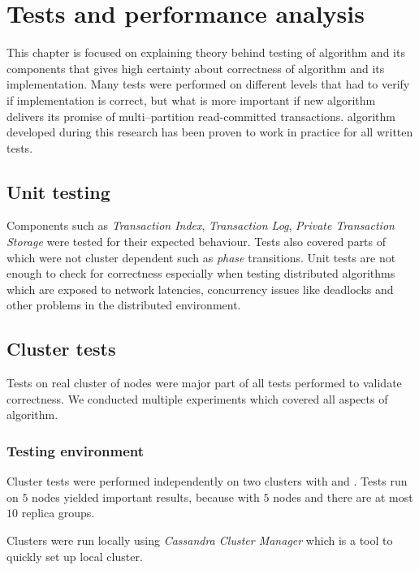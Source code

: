 
\chapter{Tests and performance analysis}\label{chapter:testing}

This chapter is focused on explaining theory behind testing of \mpt algorithm and its components that gives high certainty about correctness of algorithm and its implementation. Many tests were performed on different levels that had to verify if implementation is correct, but what is more important if new \mpt algorithm delivers its promise of multi--partition read-committed transactions. 
\mpt algorithm developed during this research has been proven to work in practice for all written tests. 

\section{Unit testing}
Components such as \emph{Transaction Index}, \emph{Transaction Log}, \emph{Private Transaction Storage} were  tested for their expected behaviour. Tests also covered parts of \mpt which were not cluster dependent such as \emph{phase} transitions. Unit tests are not enough to check for correctness especially when testing distributed algorithms which are  exposed to network latencies, concurrency issues like deadlocks and other problems in the distributed environment. 

\section{Cluster tests}
Tests on real cluster of nodes were major part of all tests performed to validate \mpt correctness. We conducted multiple experiments which covered all aspects of \mpt algorithm. 

\subsection{Testing environment}
Cluster tests were performed independently on two clusters with  and . Tests run on $5$ nodes yielded important results, because with $5$ nodes and  there are at most $10$ replica groups. 

Clusters were run locally using \emph{Cassandra Cluster Manager} which is a tool to quickly set up local cluster.

